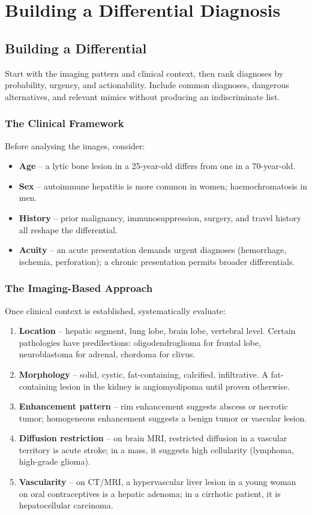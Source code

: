 \chapter{Building a Differential Diagnosis}

\label{ch:ch34_differential_dx}

\section{Building a Differential}
Start with the imaging pattern and clinical context, then rank diagnoses by probability, urgency, and actionability. Include common diagnoses, dangerous alternatives, and relevant mimics without producing an indiscriminate list.

\subsection{The Clinical Framework}
Before analysing the images, consider:
\begin{itemize}
    \item \textbf{Age} -- a lytic bone lesion in a 25-year-old differs from one in a 70-year-old.
    \item \textbf{Sex} -- autoimmune hepatitis is more common in women; haemochromatosis in men.
    \item \textbf{History} -- prior malignancy, immunosuppression, surgery, and travel history all reshape the differential.
    \item \textbf{Acuity} -- an acute presentation demands urgent diagnoses (hemorrhage, ischemia, perforation); a chronic presentation permits broader differentials.
\end{itemize}

\subsection{The Imaging-Based Approach}
Once clinical context is established, systematically evaluate:
\begin{enumerate}
    \item \textbf{Location} -- hepatic segment, lung lobe, brain lobe, vertebral level. Certain pathologies have predilections: oligodendroglioma for frontal lobe, neuroblastoma for adrenal, chordoma for clivus.
    \item \textbf{Morphology} -- solid, cystic, fat-containing, calcified, infiltrative. A fat-containing lesion in the kidney is angiomyolipoma until proven otherwise.
    \item \textbf{Enhancement pattern} -- rim enhancement suggests abscess or necrotic tumor; homogeneous enhancement suggests a benign tumor or vascular lesion.
    \item \textbf{Diffusion restriction} -- on brain MRI, restricted diffusion in a vascular territory is acute stroke; in a mass, it suggests high cellularity (lymphoma, high-grade glioma).
    \item \textbf{Vascularity} -- on CT/MRI, a hypervascular liver lesion in a young woman on oral contraceptives is a hepatic adenoma; in a cirrhotic patient, it is hepatocellular carcinoma.
\end{enumerate}


